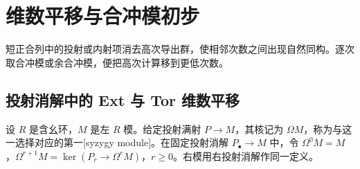 
\section{维数平移与合冲模初步}
\label{b4:sec:0805}

短正合列中的投射或内射项消去高次导出群，使相邻次数之间出现自然同构。逐次取合冲模或余合冲模，便把高次计算移到更低次数。


%
%
%

\subsection{投射消解中的 Ext 与 Tor 维数平移}
\label{b4:subsec:0805:01}

\begin{definition}\label{b4:def:syzygy-basic}
设 \(R\) 是含幺环，\(M\) 是左 \(R\) 模。给定投射满射 \(P\to M\)，其核记为 \(\Omega M\)，称为与这一选择对应的第一[syzygy module]。在固定投射消解 \(P_\bullet\to M\) 中，令 \(\Omega^0M=M\)，\(\Omega^{r+1}M=\ker(P_r\to\Omega^rM)\)，\(r\ge0\)。右模用右投射消解作同一定义。
\end{definition}

